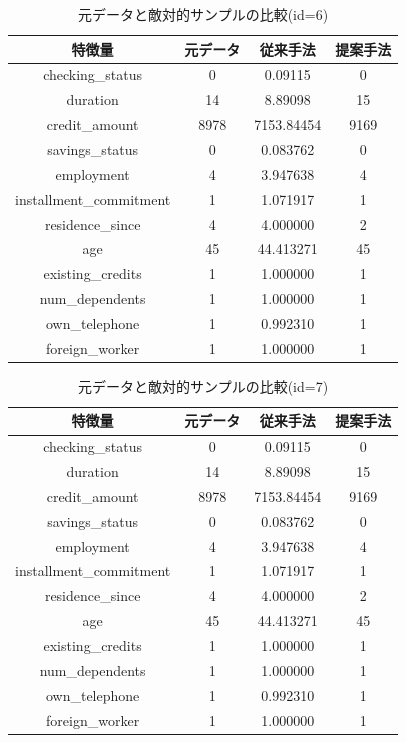 \begin{table}[H]
    \centering
    \caption{元データと敵対的サンプルの比較(id=6)}
    \begin{tabular}{|c|c|c|c|} \hline
        特徴量 & 元データ & 従来手法 & 提案手法 \\ \hline
        checking\_status & 0 & 0.09115 & 0\\ \hline
        duration & 14 & 8.89098 & 15 \\ \hline
        credit\_amount & 8978 & 7153.84454 & 9169 \\ \hline
        savings\_status & 0 & 0.083762 & 0\\ \hline
        employment & 4 & 3.947638  & 4 \\ \hline
        installment\_commitment & 1 & 1.071917 & 1\\ \hline
        residence\_since & 4 & 4.000000 & 2 \\ \hline
        age & 45 & 44.413271 & 45 \\ \hline
        existing\_credits & 1 & 1.000000 & 1 \\ \hline
        num\_dependents & 1 & 1.000000 & 1 \\ \hline
        own\_telephone & 1 & 0.992310 & 1 \\ \hline
        foreign\_worker & 1 & 1.000000 & 1 \\ \hline
    \end{tabular}
\end{table}

\begin{table}[H]
    \centering
    \caption{元データと敵対的サンプルの比較(id=7)}
    \begin{tabular}{|c|c|c|c|} \hline
        特徴量 & 元データ & 従来手法 & 提案手法 \\ \hline
        checking\_status & 0 & 0.09115 & 0\\ \hline
        duration & 14 & 8.89098 & 15 \\ \hline
        credit\_amount & 8978 & 7153.84454 & 9169 \\ \hline
        savings\_status & 0 & 0.083762 & 0\\ \hline
        employment & 4 & 3.947638  & 4 \\ \hline
        installment\_commitment & 1 & 1.071917 & 1\\ \hline
        residence\_since & 4 & 4.000000 & 2 \\ \hline
        age & 45 & 44.413271 & 45 \\ \hline
        existing\_credits & 1 & 1.000000 & 1 \\ \hline
        num\_dependents & 1 & 1.000000 & 1 \\ \hline
        own\_telephone & 1 & 0.992310 & 1 \\ \hline
        foreign\_worker & 1 & 1.000000 & 1 \\ \hline
    \end{tabular}
\end{table}

